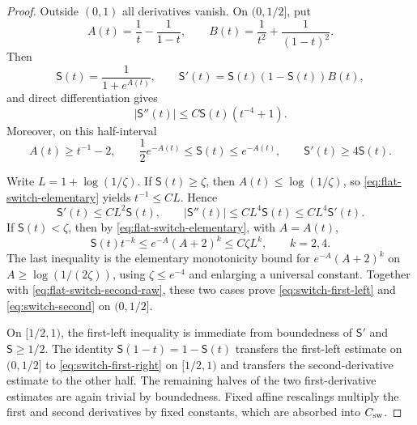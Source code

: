 \documentclass[11pt,a4paper]{article}
\theoremstyle{remark}
\begin{document}
\begin{proof}
Outside $(0,1)$ all derivatives vanish.  On $(0,1/2]$, put
\[
 A(t)=\frac1t-\frac1{1-t},
 \qquad
 B(t)=\frac1{t^2}+\frac1{(1-t)^2}.
\]
Then
\[
 \mathsf S(t)=\frac1{1+e^{A(t)}},
 \qquad
 \mathsf S'(t)=\mathsf S(t)(1-\mathsf S(t))B(t),
\]
and direct differentiation gives
\begin{equation}
 |\mathsf S''(t)|
 \le C\mathsf S(t)(t^{-4}+1).
 \label{eq:flat-switch-second-raw}
\end{equation}
Moreover, on this half-interval
\begin{equation}
 A(t)\ge t^{-1}-2,
 \qquad
 \frac12e^{-A(t)}\le\mathsf S(t)\le e^{-A(t)},
 \qquad
 \mathsf S'(t)\ge4\mathsf S(t).
 \label{eq:flat-switch-elementary}
\end{equation}

Write $L=1+\log(1/\zeta)$.  If $\mathsf S(t)\ge\zeta$, then
$A(t)\le\log(1/\zeta)$, so \eqref{eq:flat-switch-elementary} yields
$t^{-1}\le C L$.  Hence
\[
 \mathsf S'(t)\le C L^2\mathsf S(t),
 \qquad
 |\mathsf S''(t)|\le C L^4\mathsf S(t)
 \le C L^4\mathsf S'(t).
\]
If $\mathsf S(t)<\zeta$, then by
\eqref{eq:flat-switch-elementary}, with $A=A(t)$,
\[
 \mathsf S(t)t^{-k}
 \le e^{-A}(A+2)^k
 \le C\zeta L^k,
 \qquad k=2,4.
\]
The last inequality is the elementary monotonicity bound for
$e^{-A}(A+2)^k$ on
$A\ge\log(1/(2\zeta))$, using $\zeta\le e^{-4}$ and enlarging a universal
constant.  Together with \eqref{eq:flat-switch-second-raw}, these two cases
prove \eqref{eq:switch-first-left} and \eqref{eq:switch-second} on
$(0,1/2]$.

On $[1/2,1)$, the first-left inequality is immediate from boundedness of
$\mathsf S'$ and $\mathsf S\ge1/2$.  The identity
$\mathsf S(1-t)=1-\mathsf S(t)$ transfers the first-left estimate on
$(0,1/2]$ to \eqref{eq:switch-first-right} on $[1/2,1)$ and transfers the
second-derivative estimate to the other half.  The remaining halves of the
two first-derivative estimates are again trivial by boundedness.  Fixed
affine rescalings multiply the first and second derivatives by fixed
constants, which are absorbed into $C_{\rm sw}$.
\end{proof}
\end{document}
